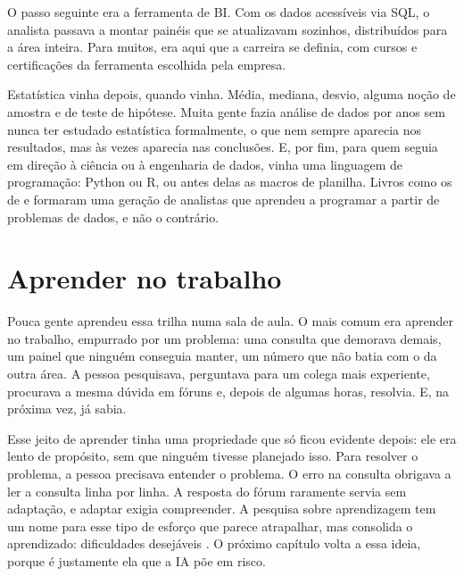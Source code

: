 O passo seguinte era a ferramenta de BI. Com os dados acessíveis via SQL, o analista
passava a montar painéis que se atualizavam sozinhos, distribuídos para a área inteira.
Para muitos, era aqui que a carreira se definia, com cursos e certificações da ferramenta
escolhida pela empresa.

Estatística vinha depois, quando vinha. Média, mediana, desvio, alguma noção de amostra e de
teste de hipótese. Muita gente fazia análise de dados por anos sem nunca ter estudado
estatística formalmente, o que nem sempre aparecia nos resultados, mas às vezes aparecia nas
conclusões. E, por fim, para quem seguia em direção à ciência ou à engenharia de dados,
vinha uma linguagem de programação: Python ou R, ou antes delas as macros de planilha.
Livros como os de \textcite{mckinney2022} e \textcite{wickham2023} formaram uma geração de
analistas que aprendeu a programar a partir de problemas de dados, e não o contrário.

\section{Aprender no trabalho}
\label{sec:aprender-no-trabalho}

Pouca gente aprendeu essa trilha numa sala de aula. O mais comum era aprender no trabalho,
empurrado por um problema: uma consulta que demorava demais, um painel que ninguém
conseguia manter, um número que não batia com o da outra área. A pessoa pesquisava, perguntava
para um colega mais experiente, procurava a mesma dúvida em fóruns e, depois de algumas
horas, resolvia. E, na próxima vez, já sabia.

Esse jeito de aprender tinha uma propriedade que só ficou evidente depois: ele era lento
de propósito, sem que ninguém tivesse planejado isso. Para resolver o problema, a pessoa
precisava entender o problema. O erro na consulta obrigava a ler a consulta linha por linha.
A resposta do fórum raramente servia sem adaptação, e adaptar exigia compreender. A pesquisa
sobre aprendizagem tem um nome para esse tipo de esforço que parece atrapalhar, mas
consolida o aprendizado: dificuldades desejáveis \parencite{bjork1994}. O próximo capítulo
volta a essa ideia, porque é justamente ela que a IA põe em risco.


